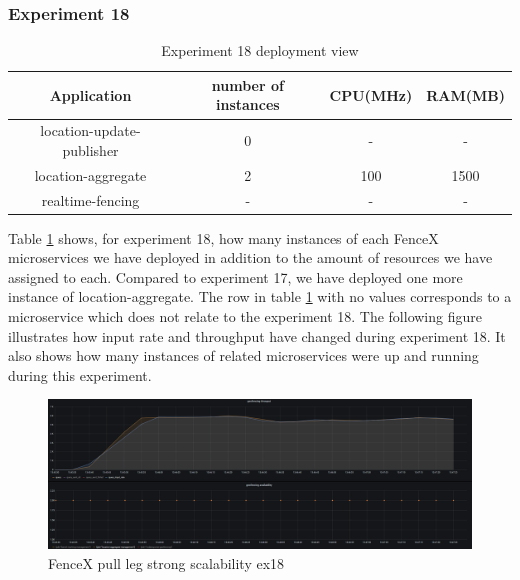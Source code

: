 \documentclass[a4]{report}
\begin{document}
    \subsubsection{Experiment 18}
    \begin{table}[h!]
        \centering
        \begin{tabular}{|c|c|c|c|}
            \hline
            Application               & number of instances & CPU(MHz) & RAM(MB) \\
            \hline
            location-update-publisher & 0                   & -        & -       \\
            location-aggregate        & 2                   & 100      & 1500    \\
            realtime-fencing          & -                   & -        & -       \\
            \hline
        \end{tabular}
        \caption{Experiment 18 deployment view}
        \label{table:ex18-dv}
    \end{table}

    Table \ref{table:ex18-dv} shows, for experiment 18, how many instances of each FenceX microservices we have
    deployed in addition to the amount of resources we have assigned to each.
    Compared to experiment 17, we have deployed one more instance of location-aggregate.
    The row in table \ref{table:ex18-dv} with no values corresponds to a microservice which does not relate to the
    experiment 18.
    The following figure illustrates how input rate and throughput have changed during experiment 18.
    It also shows how many instances of related microservices were up and running during this experiment.

    \begin{figure}
        \caption{FenceX pull leg strong scalability ex18}
        \label{fig:ex18}
        \includegraphics[scale=0.5]{images/evaluation/ex18-benchmarking-ongoing-2per4sec.png}
    \end{figure}
\end{document}
